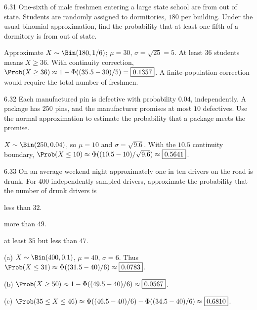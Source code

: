 \documentclass[11pt,oneside]{article}
\begin{document}
\begin{exercise}{6.31}
One-sixth of male freshmen entering a large state school are from out of state. Students are randomly assigned to dormitories, $180$ per building. Under the usual binomial approximation, find the probability that at least one-fifth of a dormitory is from out of state.
\end{exercise}

\begin{solution}
Approximate $X\sim\Bin(180,1/6)$; $\mu=30$, $\sigma=\sqrt{25}=5$. At least $36$ students means $X\ge36$. With continuity correction, $\Prob(X\ge36)\approx1-\Phi((35.5-30)/5)=\boxed{0.1357}$. A finite-population correction would require the total number of freshmen.
\end{solution}

\begin{exercise}{6.32}
Each manufactured pin is defective with probability $0.04$, independently. A package has $250$ pins, and the manufacturer promises at most $10$ defectives. Use the normal approximation to estimate the probability that a package meets the promise.
\end{exercise}

\begin{solution}
$X\sim\Bin(250,0.04)$, so $\mu=10$ and $\sigma=\sqrt{9.6}$. With the $10.5$ continuity boundary, $\Prob(X\le10)\approx\Phi((10.5-10)/\sqrt{9.6})\approx\boxed{0.5641}$.
\end{solution}

\begin{exercise}{6.33}
On an average weekend night approximately one in ten drivers on the road is drunk. For $400$ independently sampled drivers, approximate the probability that the number of drunk drivers is
\begin{exercisesubparts}
\item less than $32$.
\item more than $49$.
\item at least $35$ but less than $47$.
\end{exercisesubparts}
\end{exercise}

\begin{solution}
\noindent\textup{(a)} $X\sim\Bin(400,0.1)$, $\mu=40$, $\sigma=6$. Thus $\Prob(X\le31)\approx\Phi((31.5-40)/6)\approx\boxed{0.0783}$.

\noindent\textup{(b)} $\Prob(X\ge50)\approx1-\Phi((49.5-40)/6)\approx\boxed{0.0567}$.

\noindent\textup{(c)} $\Prob(35\le X\le46)\approx\Phi((46.5-40)/6)-\Phi((34.5-40)/6)\approx\boxed{0.6810}$.
\end{solution}
\end{document}
